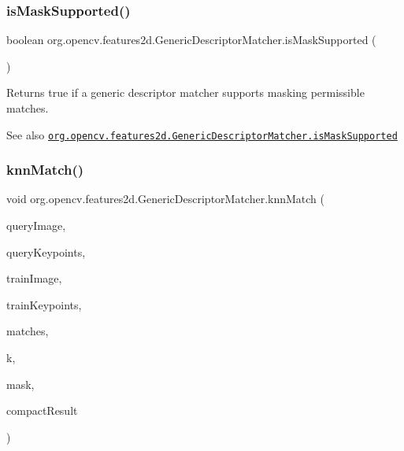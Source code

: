 \subsubsection{\texorpdfstring{is\+Mask\+Supported()}{isMaskSupported()}}
{\footnotesize\ttfamily boolean org.\+opencv.\+features2d.\+Generic\+Descriptor\+Matcher.\+is\+Mask\+Supported (\begin{DoxyParamCaption}{ }\end{DoxyParamCaption})}

Returns {\ttfamily true} if a generic descriptor matcher supports masking permissible matches.

\begin{DoxySeeAlso}{See also}
\href{http://docs.opencv.org/modules/features2d/doc/common_interfaces_of_generic_descriptor_matchers.html#genericdescriptormatcher-ismasksupported}{\tt org.\+opencv.\+features2d.\+Generic\+Descriptor\+Matcher.\+is\+Mask\+Supported} 
\end{DoxySeeAlso}
\mbox{\label{classorg_1_1opencv_1_1features2d_1_1_generic_descriptor_matcher_af6815bbb6335022c81da415b79da82e7}} 
\subsubsection{\texorpdfstring{knn\+Match()}{knnMatch()}\hspace{0.1cm}{\footnotesize\ttfamily [1/4]}}
{\footnotesize\ttfamily void org.\+opencv.\+features2d.\+Generic\+Descriptor\+Matcher.\+knn\+Match (\begin{DoxyParamCaption}\item[{\mbox{\hyperlink{classorg_1_1opencv_1_1core_1_1_mat}{Mat}}}]{query\+Image,  }\item[{\mbox{\hyperlink{classorg_1_1opencv_1_1core_1_1_mat_of_key_point}{Mat\+Of\+Key\+Point}}}]{query\+Keypoints,  }\item[{\mbox{\hyperlink{classorg_1_1opencv_1_1core_1_1_mat}{Mat}}}]{train\+Image,  }\item[{\mbox{\hyperlink{classorg_1_1opencv_1_1core_1_1_mat_of_key_point}{Mat\+Of\+Key\+Point}}}]{train\+Keypoints,  }\item[{List$<$ \mbox{\hyperlink{classorg_1_1opencv_1_1core_1_1_mat_of_d_match}{Mat\+Of\+D\+Match}} $>$}]{matches,  }\item[{int}]{k,  }\item[{\mbox{\hyperlink{classorg_1_1opencv_1_1core_1_1_mat}{Mat}}}]{mask,  }\item[{boolean}]{compact\+Result }\end{DoxyParamCaption})}

